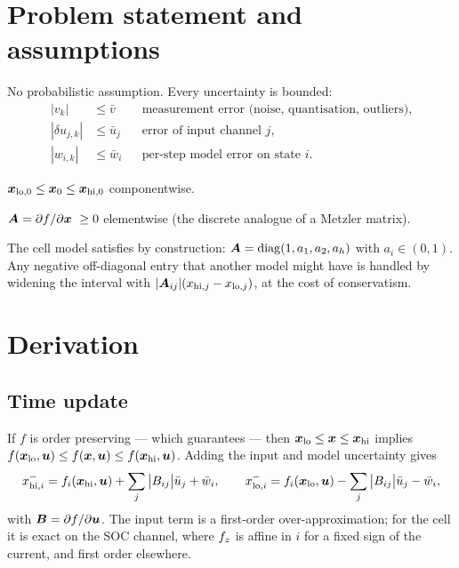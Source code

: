\section{Problem statement and assumptions}
No probabilistic assumption.  Every uncertainty is bounded:
\begin{align}
|v_k| &\le \bar{v} && \text{measurement error (noise, quantisation, outliers)} , \label{eq:io-vbar}\\
|\delta u_{j,k}| &\le \bar{u}_j && \text{error of input channel } j , \label{eq:io-ubar}\\
|w_{i,k}| &\le \bar{w}_i && \text{per-step model error on state } i . \label{eq:io-wbar}
\end{align}
\begin{assumption}\label{as:io-init}
$\bm{x}_{\mathrm{lo},0}\le\bm{x}_0\le\bm{x}_{\mathrm{hi},0}$ componentwise.
\end{assumption}
\begin{assumption}[Cooperativity]\label{as:io-coop}
$\bm{A} = \partial f/\partial\bm{x}\ \ge 0$ elementwise (the discrete analogue of a Metzler matrix).
\end{assumption}
The cell model satisfies  by construction: $\bm{A} = \operatorname{diag}(1,a_1,a_2,a_h)$ with
$a_i\in(0,1)$.  Any negative off-diagonal entry that another model might have is handled by
widening the interval with $|\bm{A}_{ij}|(x_{\mathrm{hi},j}-x_{\mathrm{lo},j})$, at the cost of
conservatism.

\section{Derivation}

\subsection{Time update}
If $f$ is order preserving --- which  guarantees --- then
$\bm{x}_{\mathrm{lo}}\le\bm{x}\le\bm{x}_{\mathrm{hi}}$ implies
$f(\bm{x}_{\mathrm{lo}},\bm{u})\le f(\bm{x},\bm{u})\le f(\bm{x}_{\mathrm{hi}},\bm{u})$.  Adding the input and model
uncertainty gives
\begin{equation}
x^-_{\mathrm{hi},i} = f_i(\bm{x}_{\mathrm{hi}},\bm{u}) + \sum_j\big|B_{ij}\big|\bar{u}_j + \bar{w}_i ,
\qquad
x^-_{\mathrm{lo},i} = f_i(\bm{x}_{\mathrm{lo}},\bm{u}) - \sum_j\big|B_{ij}\big|\bar{u}_j - \bar{w}_i ,
\label{eq:io-pred}
\end{equation}
with $\bm{B} = \partial f/\partial\bm{u}$.  The input term is a first-order over-approximation; for the
cell it is exact on the SOC channel, where $f_{z}$ is affine in $i$ for a fixed sign of the
current, and first order elsewhere.

